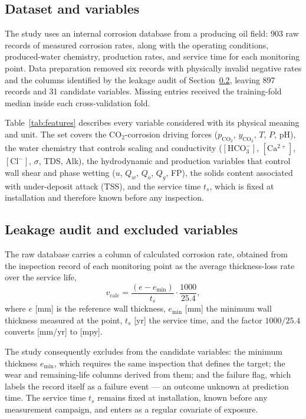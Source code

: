 \subsection{Dataset and variables}

The study uses an internal corrosion database from a producing oil field: 903 raw records of measured corrosion rates, along with the operating conditions, produced-water chemistry, production rates, and service time for each monitoring point. Data preparation removed six records with physically invalid negative rates and the columns identified by the leakage audit of Section~\ref{sec:vmod}, leaving 897 records and 31 candidate variables. Missing entries received the training-fold median inside each cross-validation fold.

Table~\ref{tab:features} describes every variable considered with its physical meaning and unit. The set covers the CO$_2$-corrosion driving forces ($p_{\mathrm{CO_2}}$, $y_{\mathrm{CO_2}}$, $T$, $P$, pH), the water chemistry that controls scaling and conductivity ($[\mathrm{HCO_3^-}]$, $[\mathrm{Ca^{2+}}]$, $[\mathrm{Cl^-}]$, $\sigma$, TDS, Alk), the hydrodynamic and production variables that control wall shear and phase wetting ($u$, $Q_w$, $Q_o$, $Q_g$, FP), the solids content associated with under-deposit attack (TSS), and the service time $t_s$, which is fixed at installation and therefore known before any inspection.



\subsection{Leakage audit and excluded variables}
\label{sec:vmod}

The raw database carries a column of calculated corrosion rate, obtained from the inspection record of each monitoring point as the average thickness-loss rate over the service life,
\begin{equation}
  v_{\mathrm{calc}} = \frac{(e - e_{\min})}{t_s}
                      \cdot \frac{1000}{25.4},
  \label{eq:vmod}
\end{equation}
where $e$ [mm] is the reference wall thickness, $e_{\min}$ [mm] the minimum wall thickness measured at the point, $t_s$ [yr] the service time, and the factor $1000/25.4$ converts [mm/yr] to [mpy].  

The study consequently excludes from the candidate variables: the minimum thickness $e_{\min}$, which requires the same inspection that defines the target; the wear and remaining-life columns derived from them; and the failure flag, which labels the record itself as a failure event --- an outcome unknown at prediction time. The service time $t_s$ remains fixed at installation, known before any measurement campaign, and enters as a regular covariate of exposure.
